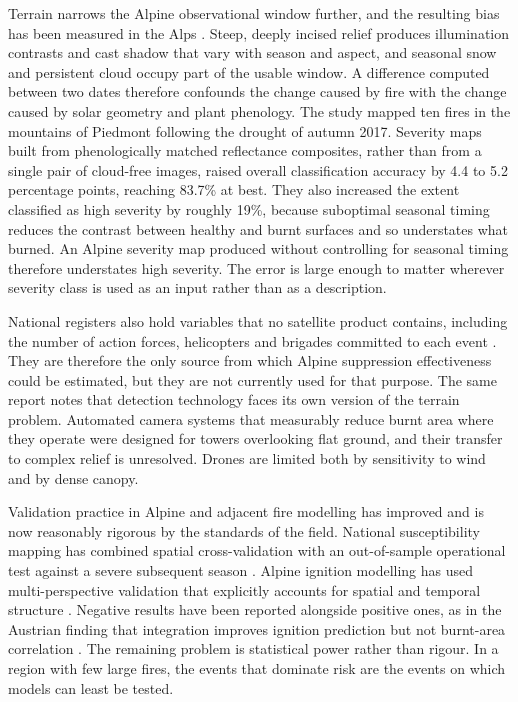 \documentclass[11pt,a4paper]{article}
\begin{document}
Terrain narrows the Alpine observational window further, and the resulting bias has been measured in the Alps \citep{morresi_mapping_2022}. Steep, deeply incised relief produces illumination contrasts and cast shadow that vary with season and aspect, and seasonal snow and persistent cloud occupy part of the usable window. A difference computed between two dates therefore confounds the change caused by fire with the change caused by solar geometry and plant phenology. The study mapped ten fires in the mountains of Piedmont following the drought of autumn 2017. Severity maps built from phenologically matched reflectance composites, rather than from a single pair of cloud-free images, raised overall classification accuracy by 4.4 to 5.2 percentage points, reaching 83.7\% at best. They also increased the extent classified as high severity by roughly 19\%, because suboptimal seasonal timing reduces the contrast between healthy and burnt surfaces and so understates what burned. An Alpine severity map produced without controlling for seasonal timing therefore understates high severity. The error is large enough to matter wherever severity class is used as an input rather than as a description.

National registers also hold variables that no satellite product contains, including the number of action forces, helicopters and brigades committed to each event \citep{muller_forest_2020}. They are therefore the only source from which Alpine suppression effectiveness could be estimated, but they are not currently used for that purpose. The same report notes that detection technology faces its own version of the terrain problem. Automated camera systems that measurably reduce burnt area where they operate were designed for towers overlooking flat ground, and their transfer to complex relief is unresolved. Drones are limited both by sensitivity to wind and by dense canopy.

Validation practice in Alpine and adjacent fire modelling has improved and is now reasonably rigorous by the standards of the field. National susceptibility mapping has combined spatial cross-validation with an out-of-sample operational test against a severe subsequent season \citep{trucchia_defining_2022}. Alpine ignition modelling has used multi-perspective validation that explicitly accounts for spatial and temporal structure \citep{moreno_1_nodate}. Negative results have been reported alongside positive ones, as in the Austrian finding that integration improves ignition prediction but not burnt-area correlation \citep{muller_towards_2020}. The remaining problem is statistical power rather than rigour. In a region with few large fires, the events that dominate risk are the events on which models can least be tested.
\end{document}
